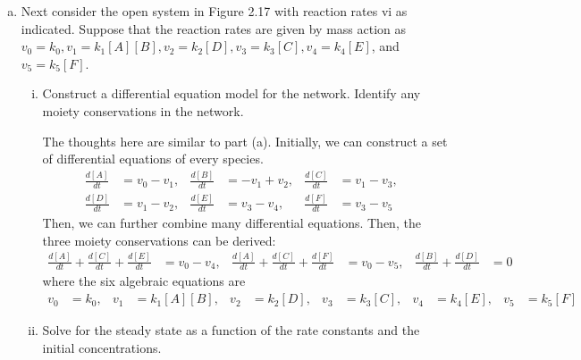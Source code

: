 \documentclass[paper=a4, fontsize=11pt]{scrartcl} %
\numberwithin{equation}{section} %
\numberwithin{figure}{section} %
\numberwithin{table}{section} %
\begin{document}
\begin{enumerate}[a)]
\begin{enumerate}[i)]
		\end{enumerate}
		\item Next consider the open system in Figure 2.17 with reaction rates vi as indicated. Suppose that the reaction rates are given by mass action as $v_{0} = k_{0}, v_{1} = k_{1}\left[A\right]\left[B\right], v_{2} = k_{2}\left[D\right], v_{3} = k_{3}\left[C\right], v_{4} = k_{4}\left[E\right]$, and $v_{5} = k_{5}\left[F\right]$.

		\begin{enumerate}[i)]
			\item Construct a differential equation model for the network. Identify any moiety conservations in the network.

			The thoughts here are similar to part (a). Initially, we can construct a set of differential equations of every species.
			\begin{align*}
				\frac{d\left[ A \right]}{dt}&=v_{0}-v_{1},&\frac{d\left[ B \right]}{dt}&=-v_{1}+v_{2},&
				\frac{d\left[ C \right]}{dt}&=v_{1}-v_{3},&\\
				\frac{d\left[ D \right]}{dt}&=v_{1}-v_{2},&\frac{d\left[ E \right]}{dt}&=v_{3}-v_{4},&
				\frac{d\left[ F \right]}{dt}&=v_{3}-v_{5}
			\end{align*}
			Then, we can further combine many differential equations. Then, the three moiety conservations can be derived: 
			\begin{align*}
				\frac{d\left[ A \right]}{dt}+\frac{d\left[ C \right]}{dt}+\frac{d\left[ E \right]}{dt}&=v_{0}-v_{4},&
				\frac{d\left[ A \right]}{dt}+\frac{d\left[ C \right]}{dt}+\frac{d\left[ F \right]}{dt}&=v_{0}-v_{5},&
				\frac{d\left[ B \right]}{dt}+\frac{d\left[ D \right]}{dt}&=0&
			\end{align*}
			where the six algebraic equations are
			\begin{align*}
				v_{0}&=k_{0},&v_{1}&=k_{1}\left[ A \right]\left[ B \right],&v_{2}&=k_{2}\left[ D \right],&v_{3}&=k_{3}\left[ C \right],&v_{4}&=k_{4}\left[E\right],&v_{5}&=k_{5}\left[F\right]&
			\end{align*}

			\item Solve for the steady state as a function of the rate constants and the initial concentrations.


\end{enumerate}
\end{enumerate}
\end{document}
